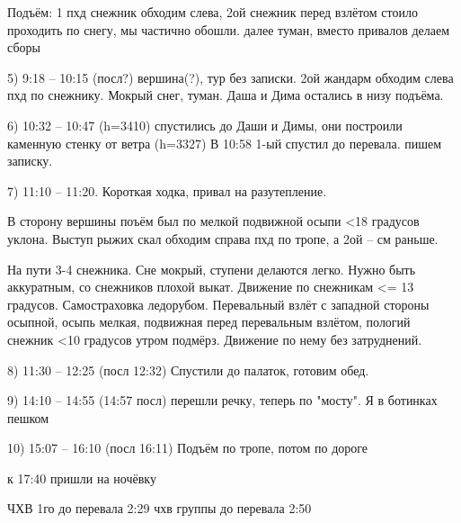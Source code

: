 Подъём: 1 пхд снежник обходим слева, 2ой снежник перед взлётом стоило проходить по снегу, мы частично обошли. далее туман, вместо привалов делаем сборы

5) 9:18 -- 10:15 (посл?) вершина(?), тур без записки. 2ой жандарм обходим слева пхд по снежнику. Мокрый снег, туман. Даша и Дима остались в низу подъёма.

6) 10:32 -- 10:47 (h=3410) спустились до Даши и Димы, они построили каменную стенку от ветра (h=3327) В 10:58 1-ый спустил до перевала. пишем записку.

7) 11:10 -- 11:20. Короткая ходка, привал на разутепление.

В сторону вершины поъём был по мелкой подвижной осыпи <18 градусов уклона. Выступ рыжих скал обходим справа пхд по тропе, а 2ой -- см раньше.

На пути 3-4 снежника. Сне мокрый, ступени делаются легко. Нужно быть аккуратным, со снежников плохой выкат. Движение по снежникам <= 13 градусов. Самостраховка ледорубом. Перевальный взлёт с западной стороны осыпной, осыпь мелкая, подвижная перед перевальным взлётом, пологий снежник <10 градусов утром подмёрз. Движение по нему без затруднений.

8) 11:30 -- 12:25 (посл 12:32) Спустили до палаток, готовим обед.

9) 14:10 -- 14:55 (14:57 посл) перешли речку, теперь по "мосту". Я в ботинках пешком

10) 15:07 -- 16:10 (посл 16:11) Подъём по тропе, потом по дороге

к 17:40 пришли на ночёвку


ЧХВ 1го до перевала 2:29
чхв группы до перевала 2:50

    \FloatBarrier
